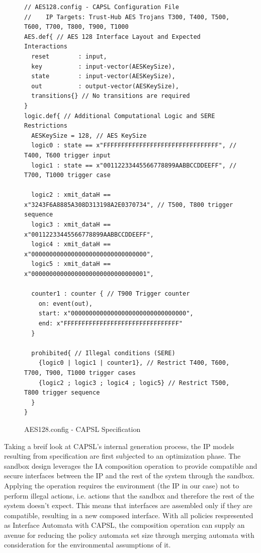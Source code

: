 \documentclass[sigconf]{acmart}
\theoremstyle{plain}
\theoremstyle{remark}
\begin{document}
\begin{figure} [t]
\begin{lstlisting}
// AES128.config - CAPSL Configuration File
//    IP Targets: Trust-Hub AES Trojans T300, T400, T500, T600, T700, T800, T900, T1000
AES.def{ // AES 128 Interface Layout and Expected Interactions
  reset        : input,
  key          : input-vector(AESKeySize),
  state        : input-vector(AESKeySize),
  out          : output-vector(AESKeySize),
  transitions{} // No transitions are required
}
logic.def{ // Additional Computational Logic and SERE Restrictions
  AESKeySize = 128, // AES KeySize
  logic0 : state == x"FFFFFFFFFFFFFFFFFFFFFFFFFFFFFFFF", // T400, T600 trigger input
  logic1 : state == x"00112233445566778899AABBCCDDEEFF", // T700, T1000 trigger case

  logic2 : xmit_dataH == x"3243F6A8885A308D313198A2E0370734", // T500, T800 trigger sequence
  logic3 : xmit_dataH == x"00112233445566778899AABBCCDDEEFF",
  logic4 : xmit_dataH == x"00000000000000000000000000000000",
  logic5 : xmit_dataH == x"00000000000000000000000000000001",

  counter1 : counter { // T900 Trigger counter
    on: event(out),
    start: x"00000000000000000000000000000000",
    end: x"FFFFFFFFFFFFFFFFFFFFFFFFFFFFFFFF"
  }

  prohibited{ // Illegal conditions (SERE)
    {logic0 | logic1 | counter1}, // Restrict T400, T600, T700, T900, T1000 trigger cases
    {logic2 ; logic3 ; logic4 ; logic5} // Restrict T500, T800 trigger sequence
  }
}
\end{lstlisting}
\vspace*{-0.2cm}
\caption{AES128.config - CAPSL Specification}
\label{fig:AES128Spec}
\vspace*{-0.3cm}
\end{figure}

Taking a breif look at CAPSL's internal generation process, the IP models resulting from specification are first subjected to an optimization phase. The sandbox design leverages the IA composition operation to provide compatible and secure interfaces between the IP and the rest of the system through the sandbox. Applying the operation requires the environment (the IP in our case) not to perform illegal actions, i.e. actions that the sandbox and therefore the rest of the system doesn't expect. This means that interfaces are assembled only if they are compatible, resulting in a new composed interface. With all policies respresented as Interface Automata with CAPSL, the composition operation can supply an avenue for reducing the policy automata set size through merging automata with consideration for the environmental assumptions of it.
\end{document}
